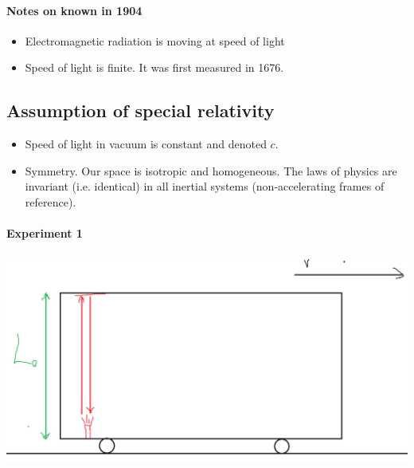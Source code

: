 \paragraph{Notes on known in 1904}
\begin{itemize}
	\item Electromagnetic radiation is moving at speed of light
	\item Speed of light is finite. It was first measured in 1676.
\end{itemize}

\subsection{Assumption of special relativity}
\begin{itemize}
	\item Speed of light in vacuum is constant and denoted $c$.
	\item Symmetry. Our space is isotropic and homogeneous. The laws of physics are invariant (i.e. identical) in all inertial systems (non-accelerating frames of reference).
\end{itemize}

\paragraph{Experiment 1}


\begin{center}
	\includegraphics[width=\linewidth]{./lect20/pic3.png}
\end{center}

